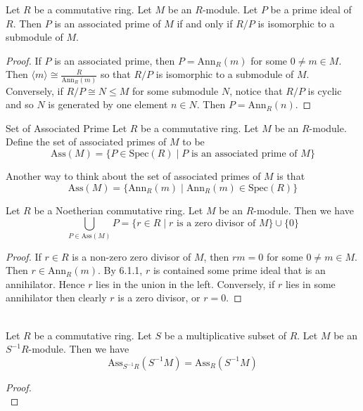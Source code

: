 \documentclass[a4paper]{article}
\begin{document}
\begin{lmm}{}{} Let $R$ be a commutative ring. Let $M$ be an $R$-module. Let $P$ be a prime ideal of $R$. Then $P$ is an associated prime of $M$ if and only if $R/P$ is isomorphic to a submodule of $M$. 
\begin{proof}
If $P$ is an associated prime, then $P=\text{Ann}_R(m)$ for some $0\neq m\in M$. Then $\langle m\rangle\cong\frac{R}{\text{Ann}_R(m)}$ so that $R/P$ is isomorphic to a submodule of $M$. Conversely, if $R/P\cong N\leq M$ for some submodule $N$, notice that $R/P$ is cyclic and so $N$ is generated by one element $n\in N$. Then $P=\text{Ann}_R(n)$. 
\end{proof}
\end{lmm}

\begin{defn}{Set of Associated Prime}{} Let $R$ be a commutative ring. Let $M$ be an $R$-module. Define the set of associated primes of $M$ to be $$\text{Ass}(M)=\{P\in\text{Spec}(R)\;|\;P\text{ is an associated prime of }M\}$$
\end{defn}

Another way to think about the set of associated primes of $M$ is that $$\text{Ass}(M)=\{\text{Ann}_R(m)\;|\;\text{Ann}_R(m)\in\text{Spec}(R)\}$$

\begin{lmm}{}{} Let $R$ be a Noetherian commutative ring. Let $M$ be an $R$-module. Then we have $$\bigcup_{P\in\text{Ass}(M)}P=\{r\in R\;|\;r\text{ is a zero divisor of }M\}\cup\{0\}$$ 
\begin{proof}
If $r\in R$ is a non-zero zero divisor of $M$, then $rm=0$ for some $0\neq m\in M$. Then $r\in\text{Ann}_R(m)$. By 6.1.1, $r$ is contained some prime ideal that is an annihilator. Hence $r$ lies in the union in the left. Conversely, if $r$ lies in some annihilator then clearly $r$ is a zero divisor, or $r=0$. 
\end{proof}
\end{lmm}

\begin{prp}{}{}\\
Let $R$ be a commutative ring. Let $S$ be a multiplicative subset of $R$. Let $M$ be an $S^{-1}R$-module. Then we have $$\text{Ass}_{S^{-1}R}(S^{-1}M)=\text{Ass}_R(S^{-1}M)$$
\begin{proof}\\

\end{proof}
\end{prp}
\end{document}
